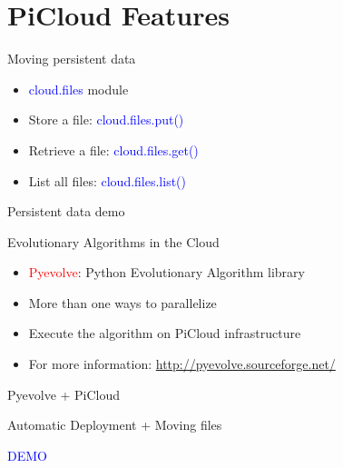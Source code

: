 \documentclass{beamer} \usepackage{fancyvrb} \usepackage{listings}
\begin{document}
    \section{PiCloud Features}

    \begin{frame}{Moving persistent data}
      \begin{itemize}
      \item \textcolor{blue}{cloud.files} module
      \item Store a file: \textcolor{blue}{cloud.files.put()}
      \item Retrieve a file: \textcolor{blue}{cloud.files.get()}
      \item List all files: \textcolor{blue}{cloud.files.list()}
      \end{itemize}
    \end{frame}

    \begin{frame}{Persistent data demo}
       
    \end{frame}

    \begin{frame}{Evolutionary Algorithms in the Cloud}
      \begin{itemize}
      \item \textcolor{red}{Pyevolve}: Python Evolutionary Algorithm library
      \item More than one ways to parallelize
      \item Execute the algorithm on PiCloud infrastructure
      \item For more information:
        \url{http://pyevolve.sourceforge.net/}
        
      \end{itemize}
    \end{frame}
    
    \begin{frame}{Pyevolve + PiCloud}
       
    \end{frame}

    \begin{frame}{Automatic Deployment + Moving files}
      \begin{center}
        \textcolor{blue}{DEMO}
      \end{center}
    \end{frame}
\end{document}
